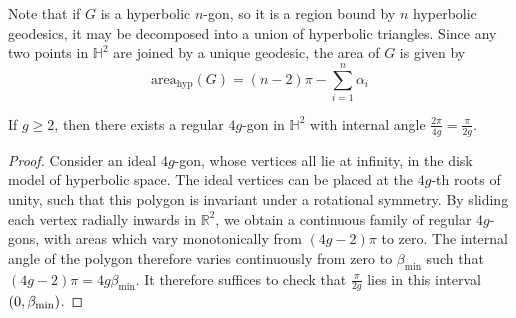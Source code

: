 Note that if \( G \) is a hyperbolic \( n \)-gon, so it is a region bound by \( n \) hyperbolic geodesics, it may be decomposed into a union of hyperbolic triangles.
Since any two points in \( \mathbb H^2 \) are joined by a unique geodesic, the area of \( G \) is given by
\[ \mathrm{area}_{\text{hyp}}(G) = (n-2)\pi - \sum_{i=1}^n \alpha_i \]
\begin{lemma}
	If \( g \geq 2 \), then there exists a regular \( 4g \)-gon in \( \mathbb H^2 \) with internal angle \( \frac{2\pi}{4g} = \frac{\pi}{2g} \).
\end{lemma}
\begin{proof}
	Consider an ideal \( 4g \)-gon, whose vertices all lie at infinity, in the disk model of hyperbolic space.
	The ideal vertices can be placed at the \( 4g \)-th roots of unity, such that this polygon is invariant under a rotational symmetry.
	By sliding each vertex radially inwards in \( \mathbb R^2 \), we obtain a continuous family of regular \( 4g \)-gons, with areas which vary monotonically from \( (4g-2)\pi \) to zero.
	The internal angle of the polygon therefore varies continuously from zero to \( \beta_{\min} \) such that \( (4g-2)\pi = 4g \beta_{\min} \).
	It therefore suffices to check that \( \frac{\pi}{2g} \) lies in this interval \( \qty(0,\beta_{\min}) \).
\end{proof}

